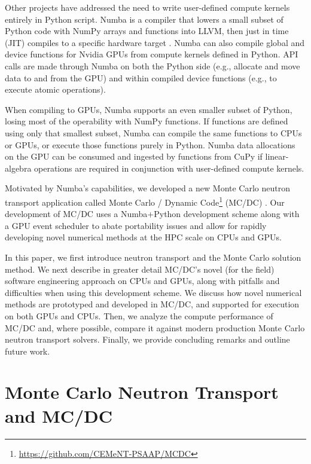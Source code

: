 Other projects have addressed the need to write user-defined compute kernels entirely in Python script.
Numba is a compiler that lowers a small subset of Python code with NumPy arrays and functions into LLVM, then just in time (JIT) compiles to a specific hardware target \cite{lam_numba_2015}. 
Numba can also compile global and device functions for Nvidia GPUs from compute kernels defined in Python.
API calls are made through Numba on both the Python side (e.g., allocate and move data to and from the GPU) and within compiled device functions (e.g., to execute atomic operations).

When compiling to GPUs, Numba supports an even smaller subset of Python, losing most of the operability with NumPy functions.
If functions are defined using only that smallest subset, Numba can compile the same functions to CPUs or GPUs, or execute those functions purely in Python.
Numba data allocations on the GPU can be consumed and ingested by functions from CuPy if linear-algebra operations are required in conjunction with user-defined compute kernels.

Motivated by Numba's capabilities, we developed a new Monte Carlo neutron transport application called Monte Carlo / Dynamic Code\footnote{\url{https://github.com/CEMeNT-PSAAP/MCDC}} (MC/DC) \cite{morgan_monte_2024, variansyah_mc23_mcdc}.
Our development of MC/DC uses a Numba+Python development scheme along with a GPU event scheduler to abate portability issues and allow for rapidly developing novel numerical methods at the HPC scale on CPUs and GPUs.

In this paper, we first introduce neutron transport and the Monte Carlo solution method.
We next describe in greater detail MC/DC's novel (for the field) software engineering approach on CPUs and GPUs, along with pitfalls and difficulties when using this development scheme.
We discuss how novel numerical methods are prototyped and developed in MC/DC, and supported for execution on both GPUs and CPUs.
Then, we analyze the compute performance of MC/DC and, where possible, compare it against modern production Monte Carlo neutron transport solvers.
Finally, we provide concluding remarks and outline future work.

\section{Monte Carlo Neutron Transport and MC/DC}

